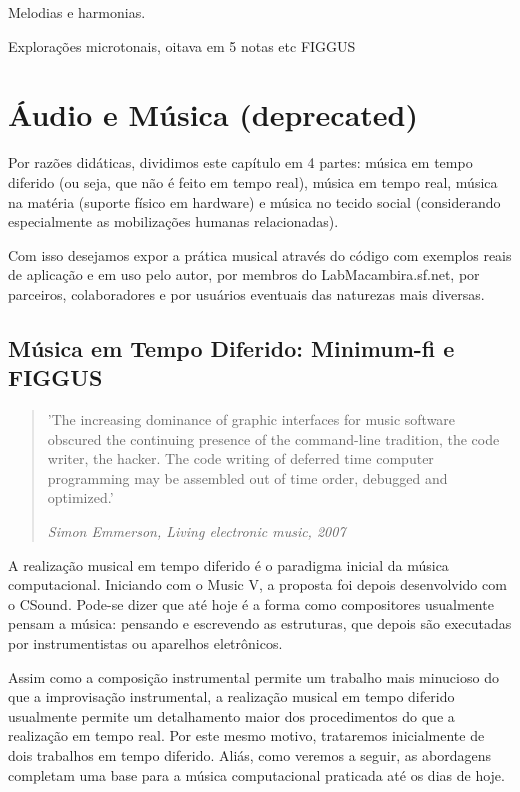 Melodias e harmonias.

Explorações microtonais, oitava em 5 notas etc
FIGGUS














\clearpage


\section{Áudio e Música (deprecated)}

Por razões didáticas, dividimos este capítulo em 4 partes: música em tempo diferido (ou seja, que não é feito em tempo real),
música em tempo real,  música na matéria (suporte físico em hardware) e música no tecido social
(considerando especialmente as mobilizações humanas relacionadas).

Com isso desejamos expor a prática musical através do código
com exemplos reais de aplicação e em uso pelo autor, por membros do LabMacambira.sf.net,
por parceiros, colaboradores e por usuários eventuais das naturezas mais diversas.

  \subsection{Música em Tempo Diferido: Minimum-fi e FIGGUS}

\begin{quotation}
\small
'The increasing dominance of graphic interfaces for music software obscured 
the continuing presence of the command-line tradition, 
the code writer, the hacker. The code writing of deferred time 
computer programming may be assembled out of time order, debugged and optimized.'

\emph{Simon Emmerson, Living electronic music, 2007}
\end{quotation}

A realização musical em tempo diferido é o paradigma inicial da música computacional.
Iniciando com o Music V, a proposta foi depois desenvolvido com o CSound. Pode-se dizer
que até hoje é a forma como compositores usualmente pensam a música: pensando
e escrevendo as estruturas, que depois são executadas por instrumentistas ou aparelhos eletrônicos.

Assim como a composição instrumental permite um trabalho mais minucioso do que
a improvisação instrumental, a realização musical em tempo diferido usualmente permite um
detalhamento maior dos procedimentos do que a realização em tempo real. Por este
mesmo motivo, trataremos inicialmente de dois trabalhos em tempo diferido.
Aliás, como veremos a seguir, as abordagens completam uma base para a música
computacional praticada até os dias de hoje.

